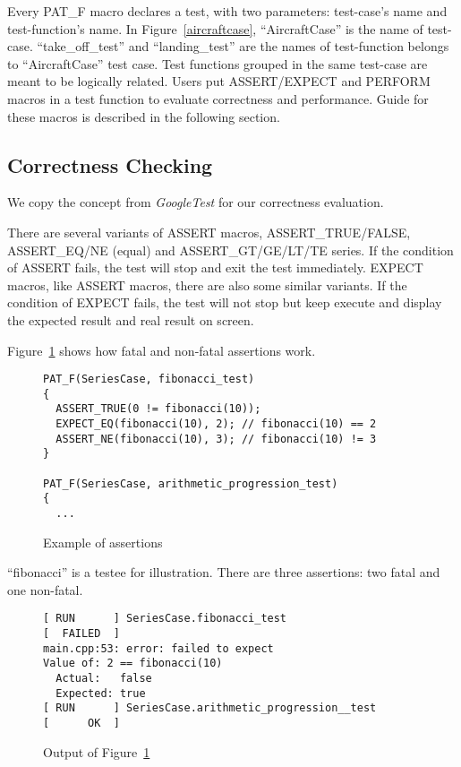 \documentclass[final]{ols}
\begin{document}
Every PAT\_F macro declares a test, with two parameters: test-case's name and test-function's name.
In Figure~\ref{aircraftcase}, ``AircraftCase'' is the name of test-case.
``take\_off\_test'' and ``landing\_test'' are the names of test-function belongs to ``AircraftCase'' test case.
Test functions grouped in the same test-case are meant to be logically related.
Users put ASSERT/EXPECT and PERFORM macros in a test function to evaluate correctness and performance.
Guide for these macros is described in the following section.

\subsection{Correctness Checking}
We copy the concept from \textit{GoogleTest} for our correctness evaluation.

There are several variants of ASSERT macros, ASSERT\_TRUE/FALSE, ASSERT\_EQ/NE (equal) and ASSERT\_GT/GE/LT/TE series.
If the condition of ASSERT fails, the test will stop and exit the test immediately.
EXPECT macros, like ASSERT macros, there are also some similar variants.
If the condition of EXPECT fails, the test will not stop but keep execute and display the expected result and real result on screen.

Figure~\ref{assert_example} shows how fatal and non-fatal assertions work.

\begin{figure}[h]
\lstset{language=C++}
\begin{lstlisting}[frame=single]
PAT_F(SeriesCase, fibonacci_test)
{
  ASSERT_TRUE(0 != fibonacci(10));
  EXPECT_EQ(fibonacci(10), 2); // fibonacci(10) == 2
  ASSERT_NE(fibonacci(10), 3); // fibonacci(10) != 3
}

PAT_F(SeriesCase, arithmetic_progression_test)
{
  ...
\end{lstlisting}
\caption{Example of assertions}
\label{assert_example}
\end{figure}

``fibonacci'' is a testee for illustration.
There are three assertions: two fatal and one non-fatal.

\begin{figure}[h]
\lstset{language=sh}
\begin{lstlisting}[frame=single]
[ RUN      ] SeriesCase.fibonacci_test
[  FAILED  ]
main.cpp:53: error: failed to expect
Value of: 2 == fibonacci(10)
  Actual:   false
  Expected: true
[ RUN      ] SeriesCase.arithmetic_progression__test
[      OK  ]
\end{lstlisting}
\caption{Output of Figure~\ref{assert_example}}
\label{assert_example_output}
\end{figure}
\end{document}
